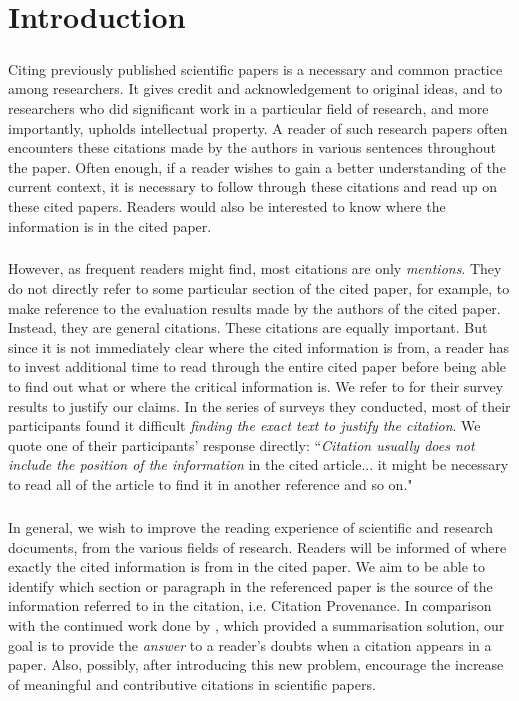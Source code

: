 \chapter{Introduction}
\label{introduction}
\paragraph{}
Citing previously published scientific papers is a necessary and common practice among researchers. It gives credit and acknowledgement to original ideas, and to researchers who did significant work in a particular field of research, and more importantly, upholds intellectual property. A reader of such research papers often encounters these citations made by the authors in various sentences throughout the paper. Often enough, if a reader wishes to gain a better understanding of the current context, it is necessary to follow through these citations and read up on these cited papers. Readers would also be interested to know where the information is in the cited paper.

\paragraph{}
However, as frequent readers might find, most citations are only \textit{mentions}. They do not directly refer to some particular section of the cited paper, for example, to make reference to the evaluation results made by the authors of the cited paper. Instead, they are general citations. These citations are equally important. But since it is not immediately clear where the cited information is from, a reader has to invest additional time to read through the entire cited paper before being able to find out what or where the critical information is. We refer to \cite{citation-sensitive} for their survey results to justify our claims. In the series of surveys they conducted, most of their participants found it difficult \textit{finding the exact text to justify the citation}. We quote one of their participants' response directly: ``\textit{Citation usually does not include the position of the information} in the cited article... it might be necessary to read all of the article to find it in another reference and so on." \cite{citation-sensitive}

\paragraph{}
In general, we wish to improve the reading experience of scientific and research documents, from the various fields of research. Readers will be informed of where exactly the cited information is from in the cited paper. We aim to be able to identify which section or paragraph in the referenced paper is the source of the information referred to in the citation, i.e. Citation Provenance. In comparison with the continued work done by \cite{csibs}, which provided a summarisation solution, our goal is to provide the \textit{answer} to a reader's doubts when a citation appears in a paper. Also, possibly, after introducing this new problem, encourage the increase of meaningful and contributive citations in scientific papers.


